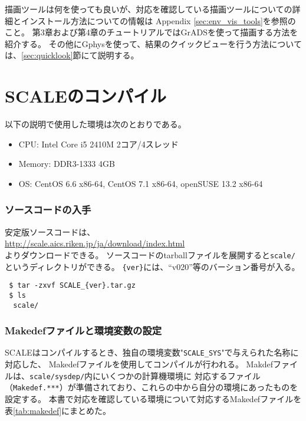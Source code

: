 描画ツールは何を使っても良いが、対応を確認している描画ツールについての詳細とインストール方法についての情報は
Appendix \ref{sec:env_vis_tools}を参照のこと。
第3章および第4章のチュートリアルではGrADSを使って描画する方法を紹介する。
その他にGphysを使って、結果のクイックビューを行う方法については、\ref{sec:quicklook}節にて説明する。



\section{SCALEのコンパイル} \label{sec:source_code}


以下の説明で使用した環境は次のとおりである。
\begin{itemize}
\item CPU: Intel Core i5 2410M 2コア/4スレッド
\item Memory: DDR3-1333 4GB
\item OS: CentOS 6.6 x86-64, CentOS 7.1 x86-64, openSUSE 13.2 x86-64
\end{itemize}

\subsubsection{ソースコードの入手}
安定版ソースコードは、\\
 \url{http://scale.aics.riken.jp/ja/download/index.html}\\
よりダウンロードできる。
ソースコードのtarballファイルを展開すると\verb|scale/|というディレクトリができる。
\verb|{ver}|には、``v020''等のバーション番号が入る。
\begin{verbatim}
 $ tar -zxvf SCALE_{ver}.tar.gz
 $ ls
  scale/
\end{verbatim}



\subsubsection{Makedefファイルと環境変数の設定}

SCALEはコンパイルするとき、独自の環境変数"\verb|SCALE_SYS|"で与えられた名称に対応した、
Makedefファイルを使用してコンパイルが行われる。
Makdefファイルは、\verb|scale/sysdep/|内にいくつかの計算機環境に
対応するファイル（\verb|Makedef.***|）が準備されており、これらの中から自分の環境にあったものを設定する。
本書で対応を確認している環境について対応するMakedefファイルを表\ref{tab:makedef}にまとめた。


